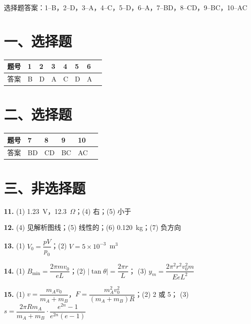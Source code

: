 
\begin{gknotice}
  选择题答案：1--B，2--D，3--A，4--C，5--D，6--A，7--BD，8--CD，9--BC，10--AC
\end{gknotice}

\section*{一、选择题}

\noindent
\begin{tabular}{@{}llllllll@{}}
\toprule
题号 & 1 & 2 & 3 & 4 & 5 & 6\\
\midrule
答案 & B & D & A & C & D & A\\
\bottomrule
\end{tabular}

\section*{二、选择题}

\noindent
\begin{tabular}{@{}llllll@{}}
\toprule
题号 & 7 & 8 & 9 & 10\\
\midrule
答案 & BD & CD & BC & AC\\
\bottomrule
\end{tabular}

\section*{三、非选择题}

\noindent
\textbf{11.} (1) 1.23~V，12.3~$\Omega$；\quad(4) 右；\quad(5) 小于

\smallskip

\noindent
\textbf{12.} (4) 见解析图线；\quad(5) 线性的；\quad(6) 0.120~kg；\quad(7) 负方向

\smallskip

\noindent
\textbf{13.} (1) $V_{0}=\dfrac{pV}{p_{0}}$；\quad(2) $V=5\times10^{-3}$~m$^{3}$

\smallskip

\noindent
\textbf{14.} (1) $B_{\min}=\dfrac{2\pi mv_{0}}{eL}$；\quad(2) $|\tan\theta|=\dfrac{2\pi r}{L}$；
\qquad(3) $y_{m}=\dfrac{2\pi^{2}r^{2}v_{0}^{2}m}{EeL^{2}}$

\smallskip

\noindent
\textbf{15.} (1) $v=\dfrac{m_{A}v_{0}}{m_{A}+m_{B}}$，$F=\dfrac{m_{A}^{2}v_{0}^{2}}{(m_{A}+m_{B})R}$；\quad(2) 2 或 5；
\qquad(3) $s=\dfrac{2\pi Rm_{A}}{m_{A}+m_{B}}\cdot\dfrac{e^{2n}-1}{e^{2n}(e-1)}$
